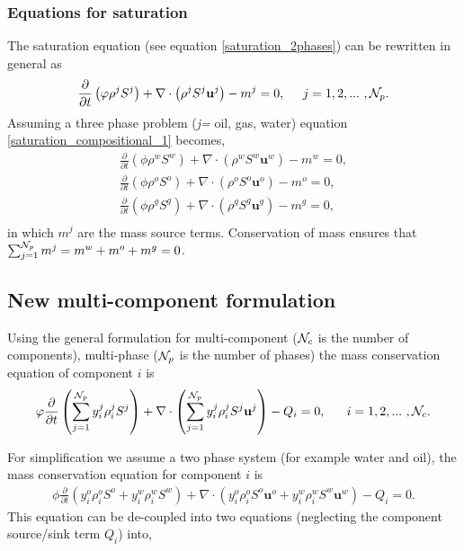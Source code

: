 \subsubsection{Equations for saturation}

 The saturation equation (see equation \ref{saturation_2phases}) can be rewritten
 in general as
\begin{equation}
\displaystyle\frac{\partial}{\partial t}\left(\phi\rho^{j}S^{j}\right) + \nabla\cdot\left(\rho^{j}S^{j}\mathbf{u}^{j}\right) -m^{j} = 0,\;\;\;\;\; j = 1,2,...~, {\cal N}_p .
\label{saturation_compositional_1}
\end{equation}
Assuming a three phase problem ({\it j=} oil, gas, water)
equation \ref{saturation_compositional_1} becomes,
\begin{eqnarray}
\displaystyle\frac{\partial}{\partial t}\left(\phi\rho^{w}S^{w}\right) + \nabla\cdot\left(\rho^{w}S^{w}\mathbf{u}^{w}\right) -m^{w} = 0, \nonumber \\
\displaystyle\frac{\partial}{\partial t}\left(\phi\rho^{o}S^{o}\right) + \nabla\cdot\left(\rho^{o}S^{o}\mathbf{u}^{o}\right) -m^{o} = 0, \\
\displaystyle\frac{\partial}{\partial t}\left(\phi\rho^{g}S^{g}\right) + \nabla\cdot\left(\rho^{g}S^{g}\mathbf{u}^{g}\right) -m^{g} = 0, \nonumber \\
\label{saturation_compositional_2}
\end{eqnarray}
in which $m^j$ are the mass source terms. Conservation of
mass ensures that $\sum_{j=1}^{{\cal N}_p} m^j=m^{w}+m^{o}+m^{g}=0$.


\subsection{New multi-component formulation}
Using the general formulation for multi-component (${\cal N}_c$ is the number of components), multi-phase (${\cal N}_p$ is the number of phases) the mass conservation equation of component $i$ is
\begin{equation}
\phi \displaystyle\frac{\partial}{\partial t}\left(\sum\limits_{j=1}^{{\cal N}_p}y_{i}^{j}\rho_{i}^{j}S^{j}\right) + \nabla\cdot\left(\sum\limits_{j=1}^{{\cal N}_p}y_{i}^{j}\rho_{i}^{j}S^{j}\mathbf{u}^{j}\right) - Q_{i} = 0, ~~~~~ i = 1,2,...~ , {\cal N}_c .
\label{saturation_compositional_4}
\end{equation}

For simplification we assume a two phase system (for example water and oil), the mass conservation equation for component $i$ is
\begin{eqnarray}
\phi \displaystyle\frac{\partial}{\partial t}\left(y_{i}^{o}\rho_i^{o}S^{o} + y_{i}^{w}\rho_i^{w}S^{w}  \right) +
\nabla\cdot\left(y_{i}^{o}\rho_i^{o}S^{o}\mathbf{u}^{o} + y_{i}^{w}\rho_i^{w}S^{w}\mathbf{u}^{w}  \right) - Q_{i} = 0 .
\end{eqnarray}
This equation can be de-coupled into
two equations (neglecting the component source/sink term $Q_i$) into,

